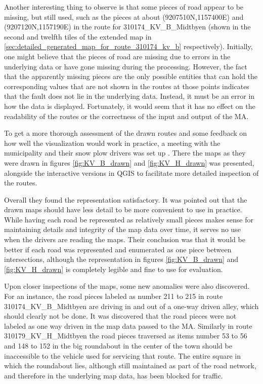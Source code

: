 Another interesting thing to observe is that some pieces of road appear to be missing, but still used, such as the pieces at about (9207510\degree N,1157400\degree E) and (9207120\degree N,1157190\degree E) in the route for 310174\_KV\_B\_Midtbyen (shown in the second and twelfth tiles of the extended map in \ref{sec:detailed_generated_map_for_route_310174_kv_b} respectively). Initially, one might believe that the pieces of road are missing due to errors in the underlying data or have gone missing during the processing. However, the fact that the apparently missing pieces are the only possible entities that can hold the corresponding values that are not shown in the routes at those points indicates that the fault does not lie in the underlying data. Instead, it must be an error in how the data is displayed. Fortunately, it would seem that it has no effect on the readability of the routes or the correctness of the input and output of the MA.

To get a more thorough assessment of the drawn routes and some feedback on how well the visualization would work in practice, a meeting with the municipality and their snow plow drivers was set up \citep{meetingToAssesTheGeneratedRoutes}. There the maps as they were drawn in figures \ref{fig:KV_B_drawn} and \ref{fig:KV_H_drawn} was presented, alongside the interactive versions in QGIS to facilitate more detailed inspection of the routes.

Overall they found the representation satisfactory. It was pointed out that the drawn maps should have less detail to be more convenient to use in practice. While having each road be represented as relatively small pieces makes sense for maintaining details and integrity of the map data over time, it serves no use when the drivers are reading the maps. Their conclusion was that it would be better if each road was represented and enumerated as one piece between intersections, although the representation in figures \ref{fig:KV_B_drawn} and \ref{fig:KV_H_drawn} is completely legible and fine to use for evaluation.

Upon closer inspections of the maps, some new anomalies were also discovered. For an instance, the road pieces labeled as number 211 to 215 in route 310174\_KV\_B\_Midtbyen are driving in and out of a one-way driven alley, which should clearly not be done. It was discovered that the road pieces were not labeled as one way driven in the map data passed to the MA. Similarly in route 310179\_KV\_H\_Midtbyen the road pieces traversed as items number 53 to 56 and 148 to 152 in the big roundabout in the center of the town should be inaccessible to the vehicle used for servicing that route. The entire square in which the roundabout lies, although still maintained as part of the road network, and therefore in the underlying map data, has been blocked for traffic.


